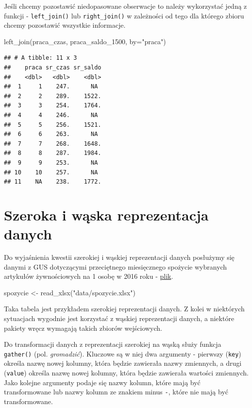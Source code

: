 \documentclass[
]{book}
\newenvironment{Shaded}{\begin{snugshade}}{\end{snugshade}}
\newcommand{\AttributeTok}[1]{\textcolor[rgb]{0.77,0.63,0.00}{#1}}
\newcommand{\FunctionTok}[1]{\textcolor[rgb]{0.00,0.00,0.00}{#1}}
\newcommand{\NormalTok}[1]{#1}
\newcommand{\OtherTok}[1]{\textcolor[rgb]{0.56,0.35,0.01}{#1}}
\newcommand{\StringTok}[1]{\textcolor[rgb]{0.31,0.60,0.02}{#1}}
\begin{document}
Jeśli chcemy pozostawić niedopasowane obserwacje to należy wykorzystać jedną z funkcji - \texttt{left\_join()} lub \texttt{right\_join()} w zależności od tego dla którego zbioru chcemy pozostawić wszystkie informacje.

\begin{Shaded}
\begin{Highlighting}[]
\FunctionTok{left\_join}\NormalTok{(praca\_czas, praca\_saldo\_1500, }\AttributeTok{by=}\StringTok{"praca"}\NormalTok{)}
\end{Highlighting}
\end{Shaded}

\begin{verbatim}
## # A tibble: 11 x 3
##    praca sr_czas sr_saldo
##    <dbl>   <dbl>    <dbl>
##  1     1    247.      NA 
##  2     2    289.    1522.
##  3     3    254.    1764.
##  4     4    246.      NA 
##  5     5    256.    1521.
##  6     6    263.      NA 
##  7     7    268.    1648.
##  8     8    287.    1984.
##  9     9    253.      NA 
## 10    10    257.      NA 
## 11    NA    238.    1772.
\end{verbatim}

\hypertarget{szeroka-i-wux105ska-reprezentacja-danych}{%
\section{Szeroka i wąska reprezentacja danych}\label{szeroka-i-wux105ska-reprezentacja-danych}}

Do wyjaśnienia kwestii szerokiej i wąskiej reprezentacji danych posłużymy się danymi z GUS dotyczącymi przeciętnego miesięcznego spożycie wybranych artykułów żywnościowych na 1 osobę w 2016 roku - \href{data/spozycie.xlsx}{plik}.

\begin{Shaded}
\begin{Highlighting}[]
\NormalTok{spozycie }\OtherTok{\textless{}{-}} \FunctionTok{read\_xlsx}\NormalTok{(}\StringTok{"data/spozycie.xlsx"}\NormalTok{)}
\end{Highlighting}
\end{Shaded}

Taka tabela jest przykładem szerokiej reprezentacji danych. Z kolei w niektórych sytuacjach wygodnie jest korzystać z wąskiej reprezentacji danych, a niektóre pakiety wręcz wymagają takich zbiorów wejściowych.

Do transformacji danych z reprezentacji szerokiej na wąską służy funkcja \texttt{gather()} (pol. \emph{gromadzić}). Kluczowe są w niej dwa argumenty - pierwszy (\texttt{key}) określa nazwę nowej kolumny, która będzie zawierała nazwy zmiennych, a drugi (\texttt{value}) określa nazwę nowej kolumny, która będzie zawierała wartości zmiennych. Jako kolejne argumenty podaje się nazwy kolumn, które mają być transformowane lub nazwy kolumn ze znakiem minus \texttt{-}, które nie mają być transformowane.
\end{document}

